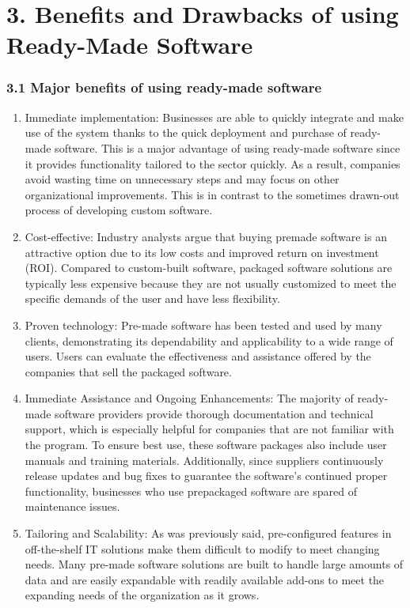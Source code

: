 \documentclass[letterpaper, 11pt]{report}
\begin{document}
\section*{3. Benefits and Drawbacks of using Ready-Made Software}
\subsubsection*{3.1 Major benefits of using ready-made software}
\begin{enumerate}
    \item Immediate implementation: Businesses are able to quickly integrate and make use of the system thanks to the quick deployment and purchase of ready-made software. This is a major advantage of using ready-made software since it provides functionality tailored to the sector quickly. As a result, companies avoid wasting time on unnecessary steps and may focus on other organizational improvements. This is in contrast to the sometimes drawn-out process of developing custom software.

    \item Cost-effective: Industry analysts argue that buying premade software is an attractive option due to its low costs and improved return on investment (ROI). Compared to custom-built software, packaged software solutions are typically less expensive because they are not usually customized to meet the specific demands of the user and have less flexibility.

    \item Proven technology: Pre-made software has been tested and used by many clients, demonstrating its dependability and applicability to a wide range of users. Users can evaluate the effectiveness and assistance offered by the companies that sell the packaged software.

    \item Immediate Assistance and Ongoing Enhancements: The majority of ready-made software providers provide thorough documentation and technical support, which is especially helpful for companies that are not familiar with the program. To ensure best use, these software packages also include user manuals and training materials. Additionally, since suppliers continuously release updates and bug fixes to guarantee the software's continued proper functionality, businesses who use prepackaged software are spared of maintenance issues.

    \item Tailoring and Scalability: As was previously said, pre-configured features in off-the-shelf IT solutions make them difficult to modify to meet changing needs. Many pre-made software solutions are built to handle large amounts of data and are easily expandable with readily available add-ons to meet the expanding needs of the organization as it grows.
\end{enumerate}
\end{document}
